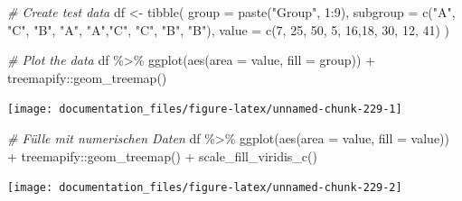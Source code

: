 \documentclass[
]{article}
\newenvironment{Shaded}{\begin{snugshade}}{\end{snugshade}}
\newcommand{\AttributeTok}[1]{\textcolor[rgb]{0.77,0.63,0.00}{#1}}
\newcommand{\CommentTok}[1]{\textcolor[rgb]{0.56,0.35,0.01}{\textit{#1}}}
\newcommand{\DecValTok}[1]{\textcolor[rgb]{0.00,0.00,0.81}{#1}}
\newcommand{\FunctionTok}[1]{\textcolor[rgb]{0.00,0.00,0.00}{#1}}
\newcommand{\NormalTok}[1]{#1}
\newcommand{\OtherTok}[1]{\textcolor[rgb]{0.56,0.35,0.01}{#1}}
\newcommand{\SpecialCharTok}[1]{\textcolor[rgb]{0.00,0.00,0.00}{#1}}
\newcommand{\StringTok}[1]{\textcolor[rgb]{0.31,0.60,0.02}{#1}}
\begin{document}
\begin{Shaded}
\begin{Highlighting}[]
\CommentTok{\# Create test data}
\NormalTok{df }\OtherTok{\textless{}{-}} \FunctionTok{tibble}\NormalTok{(}
  \AttributeTok{group =} \FunctionTok{paste}\NormalTok{(}\StringTok{"Group"}\NormalTok{, }\DecValTok{1}\SpecialCharTok{:}\DecValTok{9}\NormalTok{),}
  \AttributeTok{subgroup =} \FunctionTok{c}\NormalTok{(}\StringTok{"A"}\NormalTok{, }\StringTok{"C"}\NormalTok{, }\StringTok{"B"}\NormalTok{, }\StringTok{"A"}\NormalTok{, }\StringTok{"A"}\NormalTok{,}\StringTok{"C"}\NormalTok{, }\StringTok{"C"}\NormalTok{, }\StringTok{"B"}\NormalTok{, }\StringTok{"B"}\NormalTok{),}
  \AttributeTok{value =} \FunctionTok{c}\NormalTok{(}\DecValTok{7}\NormalTok{, }\DecValTok{25}\NormalTok{, }\DecValTok{50}\NormalTok{, }\DecValTok{5}\NormalTok{, }\DecValTok{16}\NormalTok{,}\DecValTok{18}\NormalTok{, }\DecValTok{30}\NormalTok{, }\DecValTok{12}\NormalTok{, }\DecValTok{41}\NormalTok{)}
\NormalTok{)}

\CommentTok{\# Plot the data}
\NormalTok{df }\SpecialCharTok{\%\textgreater{}\%}
  \FunctionTok{ggplot}\NormalTok{(}\FunctionTok{aes}\NormalTok{(}\AttributeTok{area =}\NormalTok{ value, }\AttributeTok{fill =}\NormalTok{ group)) }\SpecialCharTok{+}
\NormalTok{  treemapify}\SpecialCharTok{::}\FunctionTok{geom\_treemap}\NormalTok{()}
\end{Highlighting}
\end{Shaded}

\begin{center}\texttt{[image: documentation\_files/figure-latex/unnamed-chunk-229-1]} \end{center}

\begin{Shaded}
\begin{Highlighting}[]

\CommentTok{\# Fülle mit numerischen Daten}
\NormalTok{df }\SpecialCharTok{\%\textgreater{}\%}
  \FunctionTok{ggplot}\NormalTok{(}\FunctionTok{aes}\NormalTok{(}\AttributeTok{area =}\NormalTok{ value, }\AttributeTok{fill =}\NormalTok{ value)) }\SpecialCharTok{+}
\NormalTok{  treemapify}\SpecialCharTok{::}\FunctionTok{geom\_treemap}\NormalTok{() }\SpecialCharTok{+}
  \FunctionTok{scale\_fill\_viridis\_c}\NormalTok{()}
\end{Highlighting}
\end{Shaded}

\begin{center}\texttt{[image: documentation\_files/figure-latex/unnamed-chunk-229-2]} \end{center}
\end{document}
